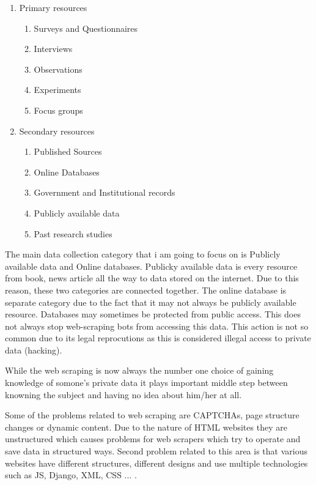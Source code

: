 \documentclass[10pt,twoside]{article}
\begin{document}
\begin{enumerate}
  \item Primary resources
    \begin{enumerate}
      \renewcommand{\theenumi}{\alph{enumi}} %
      \item Surveys and Questionnaires
      \item Interviews
      \item Observations
      \item Experiments
      \item Focus groups
    \end{enumerate}
  \item Secondary resources
    \begin{enumerate}
      \renewcommand{\theenumi}{\alph{enumi}} %
      \item Published Sources
      \item Online Databases
      \item Government and Institutional records
      \item Publicly available data
      \item Past research studies
    \end{enumerate}
\end{enumerate}
The main data collection category that i am going to focus on is Publicly available data and Online databases. Publicky available data is every resource from book, news article all the way to data stored on the internet. Due to this reason, these two categories are connected together. The online database is separate category due to the fact that it may not always be publicly available resource. Databases may sometimes be protected from public access. This does not always stop web-scraping bots from accessing this data. This action is not so common due to its legal reprocutions as this is considered illegal access to private data (hacking).

While the web scraping is now always the number one choice of gaining knowledge of somone's private data it plays important middle step between knowning the subject and having no idea about him/her at all.

Some of the problems related to web scraping are CAPTCHAs, page structure changes or dynamic content. Due to the nature of HTML websites they are unstructured which causes problems for web scrapers which try to operate and save data in structured ways. Second problem related to this area is that various websites have different structures, different designs and use multiple technologies such as JS, Django, XML, CSS ... . 
\end{document}
